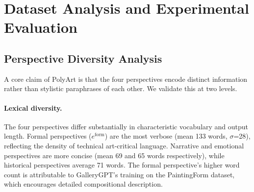 
\section{Dataset Analysis and Experimental Evaluation}

\subsection{Perspective Diversity Analysis}

A core claim of PolyArt is that the four perspectives encode distinct information rather than stylistic paraphrases of each other.
We validate this at two levels.

\paragraph{Lexical diversity.}
The four perspectives differ substantially in characteristic vocabulary and output length.
Formal perspectives ($e^{\text{form}}$) are the most verbose (mean 133 words, $\sigma$=28), reflecting the density of technical art-critical language.
Narrative and emotional perspectives are more concise (mean 69 and 65 words respectively), while historical perspectives average 71 words.
The formal perspective's higher word count is attributable to GalleryGPT's training on the PaintingForm dataset, which encourages detailed compositional description.

